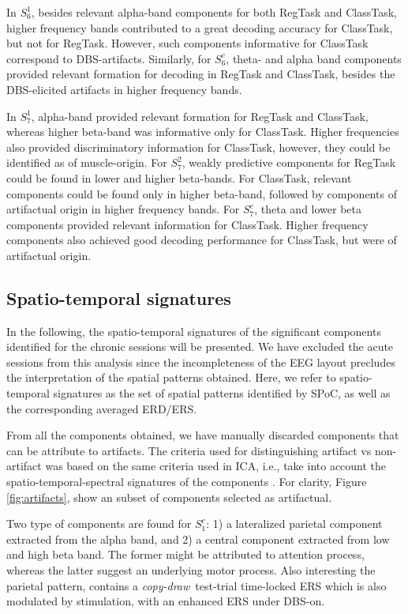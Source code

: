 \documentclass[10pt,a4paper, twocolumn]{article}
\newcommand{\cpdt}[0]{\textit{copy-draw}~test\xspace}
\newcommand{\patient}[2]{$S_{#1}^{#2}$}
\newcommand{\regtask}{RegTask\xspace}
\newcommand{\classtask}{ClassTask\xspace}
\begin{document}
In \patient{6}{1}, besides relevant alpha-band components for both \regtask and \classtask, higher frequency bands contributed to a great decoding accuracy for \classtask, but not for \regtask. However, such components informative for \classtask correspond to DBS-artifacts. Similarly, for \patient{6}{c}, theta- and alpha band components provided relevant formation for decoding in \regtask and  \classtask, besides the DBS-elicited artifacts in higher frequency bands.

In \patient{7}{1}, alpha-band provided relevant formation for \regtask and \classtask, whereas higher beta-band was informative only for \classtask. Higher frequencies also provided discriminatory information for \classtask, however, they could be identified as of muscle-origin. For \patient{7}{2}, weakly predictive components for \regtask could be found in lower and higher beta-bands. For \classtask, relevant components could be found only in higher beta-band, followed by components of artifactual origin in higher frequency bands. For \patient{7}{c}, theta and lower beta components provided relevant information for \classtask. Higher frequency components also achieved good decoding performance for \classtask, but were of artifactual origin.

\subsection{Spatio-temporal signatures}
In the following, the spatio-temporal signatures of the significant components identified for the chronic sessions will be presented. We have excluded the acute sessions from this analysis since the incompleteness of the EEG layout precludes the interpretation of the spatial patterns obtained. Here, we refer to spatio-temporal signatures as the set of spatial patterns identified by SPoC, as well as the corresponding averaged ERD/ERS.

From all the components obtained, we have manually discarded components that can be attribute to artifacts. The criteria used for distinguishing artifact vs non-artifact was based on the same criteria used in ICA, i.e., take into account the spatio-temporal-spectral signatures of the components \cite{MARAOrSimilarHowToIdentifyArtifacts}. For clarity, Figure \ref{fig:artifacts}, show an subset of components selected as artifactual.

Two type of components are found for \patient{1}{c}: 1) a lateralized parietal component extracted from the alpha band, and 2) a central component extracted from low and high beta band. The former might be attributed to attention process, whereas the latter suggest an underlying motor process. Also interesting the parietal pattern, contains a \cpdt-trial time-locked ERS which is also modulated by stimulation, with an enhanced ERS under DBS-on. 
\end{document}
